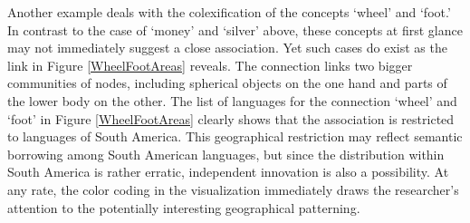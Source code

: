 Another example deals with the colexification of the concepts `wheel' and `foot.' In contrast to the case of `money' and `silver' above, these concepts at first glance may not immediately suggest a close association. Yet such cases do exist as the link in Figure \ref{WheelFootAreas} reveals. The connection links two bigger communities of nodes, including spherical objects on the one hand and parts of the lower body on the other. The list of languages for the connection `wheel' and `foot' in Figure \ref{WheelFootAreas} clearly shows that the association is restricted to languages of South America. 
This geographical restriction may reflect semantic borrowing among South American languages, but since the distribution within South America is rather erratic, independent innovation is also a possibility. At any rate, the color coding in the visualization immediately draws the researcher's attention to the potentially interesting geographical patterning.



